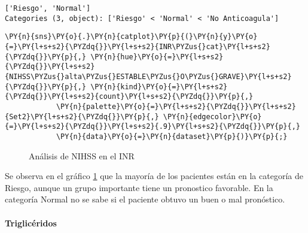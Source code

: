            \begin{tcolorbox}[breakable, size=fbox, boxrule=.5pt, pad at break*=1mm, opacityfill=0]
\begin{Verbatim}[commandchars=\\\{\}]
['Riesgo', 'Normal']
Categories (3, object): ['Riesgo' < 'Normal' < 'No Anticoagula']
\end{Verbatim}
\end{tcolorbox}
        
    \begin{tcolorbox}[breakable, size=fbox, boxrule=1pt, pad at break*=1mm,colback=cellbackground, colframe=cellborder]
\begin{Verbatim}[commandchars=\\\{\}]
\PY{n}{sns}\PY{o}{.}\PY{n}{catplot}\PY{p}{(}\PY{n}{y}\PY{o}{=}\PY{l+s+s2}{\PYZdq{}}\PY{l+s+s2}{INR\PYZus{}cat}\PY{l+s+s2}{\PYZdq{}}\PY{p}{,} \PY{n}{hue}\PY{o}{=}\PY{l+s+s2}{\PYZdq{}}\PY{l+s+s2}{NIHSS\PYZus{}alta\PYZus{}ESTABLE\PYZus{}O\PYZus{}GRAVE}\PY{l+s+s2}{\PYZdq{}}\PY{p}{,} \PY{n}{kind}\PY{o}{=}\PY{l+s+s2}{\PYZdq{}}\PY{l+s+s2}{count}\PY{l+s+s2}{\PYZdq{}}\PY{p}{,}
            \PY{n}{palette}\PY{o}{=}\PY{l+s+s2}{\PYZdq{}}\PY{l+s+s2}{Set2}\PY{l+s+s2}{\PYZdq{}}\PY{p}{,} \PY{n}{edgecolor}\PY{o}{=}\PY{l+s+s2}{\PYZdq{}}\PY{l+s+s2}{.9}\PY{l+s+s2}{\PYZdq{}}\PY{p}{,}
            \PY{n}{data}\PY{o}{=}\PY{n}{dataset}\PY{p}{)}\PY{p}{;}
\end{Verbatim}
\end{tcolorbox}

\begin{center}
    	\begin{figure}[H]
	\centering
	\caption{Análisis de NIHSS en el INR}
	\label{fig:aNISSi}
	\end{figure}
\end{center}
    
    Se observa en el gráfico \ref{fig:aNISSi} que la mayoría de los pacientes están en la
categoría de Riesgo, aunque un grupo importante tiene un pronostico
favorable. En la categoría Normal no se sabe si el paciente obtuvo un
buen o mal pronóstico.

    \hypertarget{triglicuxe9ridos}{%
\paragraph{Triglicéridos}\label{triglicuxe9ridos}}

